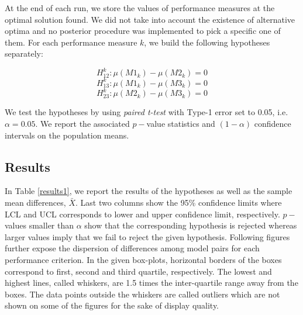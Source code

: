 \documentclass[conference]{IEEEtran}
\begin{document}
At the end of each run, we store the values of performance measures at the optimal solution found. We did not take into account the existence of alternative optima and no posterior procedure was implemented to pick a specific one of them. For each performance measure $k$, we build the following hypotheses separately:

\begin{equation}
    H_{12}^k:\mu(M1_k)-\mu(M2_k)=0   
\end{equation}
\begin{equation}
     H_{13}^k:\mu(M1_k)-\mu(M3_k)=0
\end{equation}
\begin{equation}
     H_{23}^k:\mu(M2_k)-\mu(M3_k)=0
\end{equation}

We test the hypotheses by using \textit{paired t-test} with Type-1 error set to 0.05, i.e. $\alpha = 0.05$. We report the associated $p-$value statistics and $(1-\alpha)$ confidence intervals on the population means. 

\subsection{Results}
In Table \ref{results1}, we report the results of the hypotheses as well as the sample mean differences, $\bar{X}$. Last two columns show the 95\% confidence limits where LCL and UCL corresponds to lower and upper confidence limit, respectively. $p-$values smaller than $\alpha$ show that the corresponding hypothesis is rejected whereas larger values imply that we fail to reject the given hypothesis. Following figures further expose the dispersion of differences among model pairs for each performance criterion. In the given box-plots, horizontal borders of the boxes correspond to first, second and third quartile,  respectively. The lowest and highest lines, called whiskers, are 1.5 times the inter-quartile range away from the boxes. The data points outside the whiskers are called outliers which are not shown on some of the figures for the sake of display quality. 
\end{document}
